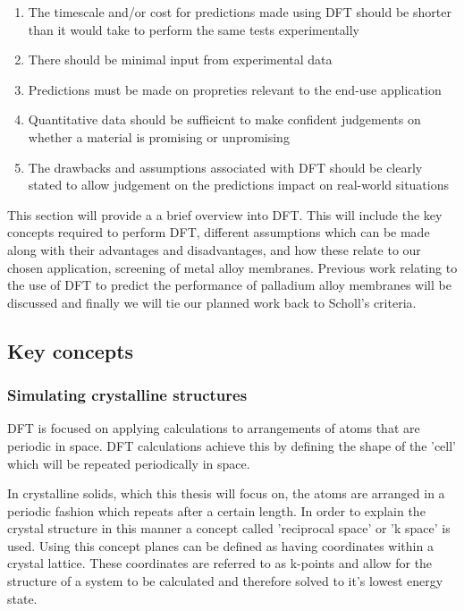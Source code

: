 \begin{enumerate}
    \item The timescale and/or cost for predictions made using DFT should be shorter than it would take to perform the same tests experimentally
    \item There should be minimal input from experimental data
    \item Predictions must be made on propreties relevant to the end-use application
    \item Quantitative data should be suffieicnt to make confident judgements on whether a material is promising or unpromising
    \item The drawbacks and assumptions associated with DFT should be clearly stated to allow judgement on the predictions impact on real-world situations
\end{enumerate}

This section will provide a a brief overview into DFT. This will include the key concepts required to perform DFT, different assumptions which can be made along with their advantages and disadvantages, and how these relate to our chosen application, screening of metal alloy membranes. Previous work relating to the use of DFT to predict the performance of palladium alloy membranes will be discussed and finally we will tie our planned work back to Scholl's criteria.

\subsection{Key concepts}
\subsubsection{Simulating crystalline structures}
DFT is focused on applying calculations to arrangements of atoms that are periodic in space. DFT calculations achieve this by defining the shape of the 'cell' which will be repeated periodically in space. \cite{doi:10.1002/9780470447710.ch2}

In crystalline solids, which this thesis will focus on, the atoms are arranged in a periodic fashion which repeats after a certain length. In order to explain the crystal structure in this manner a concept called 'reciprocal space' or 'k space' is used. Using this concept planes can be defined as having coordinates within a crystal lattice. These coordinates are referred to as k-points and allow for the structure of a system to be calculated and therefore solved to it's lowest energy state. \cite{doi:10.1002/9780470447710.ch2}

